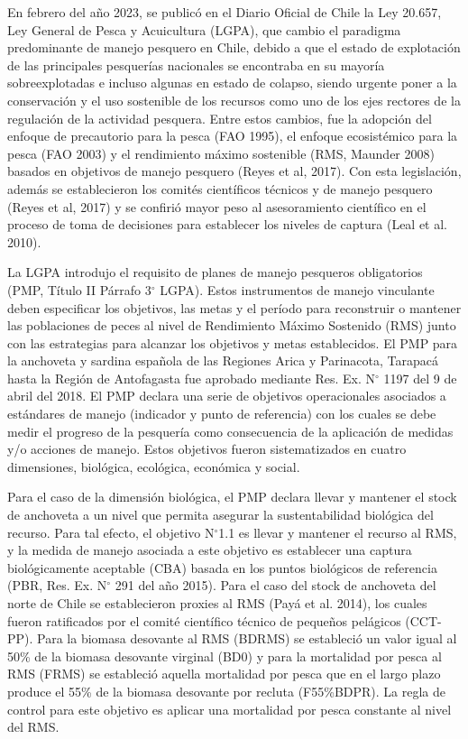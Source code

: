

En febrero del año 2023, se publicó en el Diario Oficial de Chile la Ley 20.657, Ley General de Pesca y Acuicultura (LGPA), que cambio el paradigma predominante de manejo pesquero en Chile, debido a que el estado de explotación de las principales pesquerías nacionales se encontraba en su mayoría sobreexplotadas e incluso algunas en estado de colapso, siendo urgente poner a la conservación y el uso sostenible de los recursos como uno de los ejes rectores de la regulación de la actividad pesquera. Entre estos cambios, fue la adopción del enfoque de precautorio para la pesca (FAO 1995), el enfoque ecosistémico para la pesca (FAO 2003) y el rendimiento máximo sostenible (RMS, Maunder 2008) basados en objetivos de manejo pesquero (Reyes et al, 2017). Con esta legislación, además se establecieron los comités científicos técnicos y de manejo pesquero (Reyes et al, 2017) y se confirió mayor peso al asesoramiento científico en el proceso de toma de decisiones para establecer los niveles de captura (Leal et al. 2010).
\newline

La LGPA introdujo el requisito de planes de manejo pesqueros obligatorios (PMP, Título II Párrafo 3$^\circ$ LGPA). Estos instrumentos de manejo vinculante deben especificar los objetivos, las metas y el período para reconstruir o mantener las poblaciones de peces al nivel de Rendimiento Máximo Sostenido (RMS) junto con las estrategias para alcanzar los objetivos y metas establecidos. El PMP para la anchoveta y sardina española de las Regiones Arica y Parinacota, Tarapacá hasta la Región de Antofagasta fue aprobado mediante Res. Ex. N$^\circ$ 1197 del 9 de abril del 2018. El PMP declara una serie de objetivos operacionales asociados a estándares de manejo (indicador y punto de referencia) con los cuales se debe medir el progreso de la pesquería como consecuencia de la aplicación de medidas y/o acciones de manejo. Estos objetivos fueron sistematizados en cuatro dimensiones, biológica, ecológica, económica y social.
\newline

Para el caso de la dimensión biológica, el PMP declara llevar y mantener el stock de anchoveta a un nivel que permita asegurar la sustentabilidad biológica del recurso. Para tal efecto, el objetivo N$^\circ$1.1 es llevar y mantener el recurso al RMS, y la medida de manejo asociada a este objetivo es establecer una captura biológicamente aceptable (CBA) basada en los puntos biológicos de referencia (PBR, Res. Ex. N$^\circ$ 291 del año 2015). Para el caso del stock de anchoveta del norte de Chile se establecieron proxies al RMS (Payá et al. 2014), los cuales fueron ratificados por el comité científico técnico de pequeños pelágicos (CCT-PP). Para la biomasa desovante al RMS (BDRMS) se estableció un valor igual al 50\% de la biomasa desovante virginal (BD0) y para la mortalidad por pesca al RMS (FRMS) se estableció aquella mortalidad por pesca que en el largo plazo produce el 55\% de la biomasa desovante por recluta (F55\%BDPR). La regla de control para este objetivo es aplicar una mortalidad por pesca constante al nivel del RMS.
\newline

